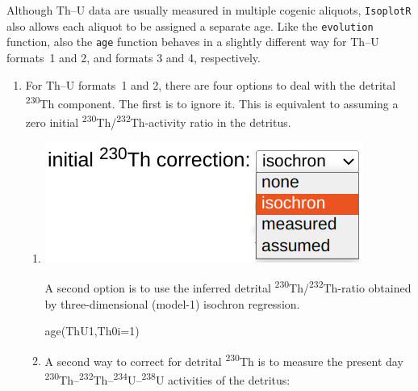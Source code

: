 \begin{refsection}
Although Th--U data are usually measured in multiple cogenic aliquots,
\texttt{IsoplotR} also allows each aliquot to be assigned a separate
age. Like the \texttt{evolution} function, also the \texttt{age}
function behaves in a slightly different way for Th--U formats~1 and
2, and formats 3 and 4, respectively.

\begin{enumerate}

\item For Th--U formats~1 and 2, there are four options to deal with
  the detrital \textsuperscript{230}Th component. The first is to
  ignore it. This is equivalent to assuming a zero initial
  \textsuperscript{230}Th/\textsuperscript{232}Th-activity ratio in
  the detritus.

  \begin{enumerate}
  
  \item \begin{minipage}[t]{.35\linewidth}
    \strut\vspace*{-\baselineskip}\newline
    \includegraphics[width=\linewidth]{../figures/ThUdetritalisochroncorr.png}
  \end{minipage}
    \begin{minipage}[t]{.65\linewidth}
      A second option is to use the inferred detrital
      \textsuperscript{230}Th/\textsuperscript{232}Th-ratio obtained
      by three-dimensional (model-1) isochron regression.
    \end{minipage}

\begin{console}
age(ThU1,Th0i=1)
\end{console}

\item A second way to correct for detrital \textsuperscript{230}Th is
  to measure the present day
  \textsuperscript{230}Th--\textsuperscript{232}Th--\textsuperscript{234}U--\textsuperscript{238}U
  activities of the detritus:\\


\end{enumerate}
\end{enumerate}
\end{refsection}
